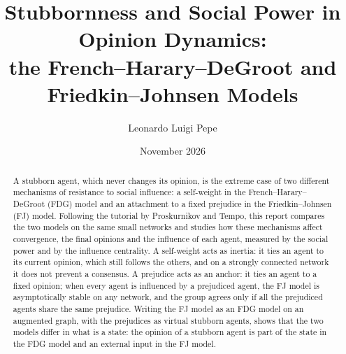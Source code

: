 \documentclass[11pt,a4paper]{article}
\title{Stubbornness and Social Power in Opinion Dynamics:\\ the French--Harary--DeGroot and Friedkin--Johnsen Models}
\author{Leonardo Luigi Pepe}
\date{November 2026}
\theoremstyle{plaintight}
\theoremstyle{definitiontight}
\theoremstyle{remarktight}
\begin{document}
\maketitle

\begin{abstract}
A stubborn agent, which never changes its opinion, is the extreme case of two different
mechanisms of resistance to social influence: a self-weight in the
French--Harary--DeGroot (FDG) model and an attachment to a fixed prejudice in the
Friedkin--Johnsen (FJ) model. Following the tutorial by Proskurnikov and Tempo, this
report compares the two models on the same small networks and studies how these
mechanisms affect convergence, the final opinions and the influence of each agent,
measured by the social power and by the influence centrality. A self-weight acts as
inertia: it ties an agent to its current opinion, which still follows the others, and on
a strongly connected network it does not prevent a consensus. A prejudice acts as an
anchor: it ties an agent to a fixed opinion; when every agent is influenced by a
prejudiced agent, the FJ model is asymptotically stable on any network, and the group
agrees only if all the prejudiced agents share the same prejudice. Writing the FJ model
as an FDG model on an augmented graph, with the prejudices as virtual stubborn agents,
shows that the two models differ in what is a state: the opinion of a stubborn agent is
part of the state in the FDG model and an external input in the FJ model.
\end{abstract}
\end{document}
